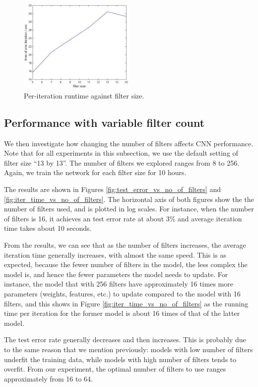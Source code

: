 \documentclass[10pt,twocolumn]{article}
\begin{document}
\begin{figure}
\includegraphics[width = 0.5\textwidth]{figure/iter_time_vs_filter_size}
\caption{Per-iteration runtime against filter size.}
\label{fig:iter_time_vs_filter_size}
\end{figure}

\subsection{Performance with variable filter count}

We then investigate how changing the number of filters affects CNN performance. Note that for all experiments in this subsection, we use the default setting of filter size ``13 by 13''. The number of filters we explored ranges from 8 to 256. Again, we train the network for each filter size for 10 hours.

The results are shown in Figures \ref{fig:test_error_vs_no_of_filters} and \ref{fig:iter_time_vs_no_of_filters}. The horizontal axis of both figures show the the number of filters used, and is plotted in log scales. For instance, when the number of filters is 16, it achieves an test error rate at about 3\% and average iteration time takes about 10 seconds.

From the results, we can see that as the number of filters increases, the average iteration time generally increases, with almost the same speed. This is as expected, because the fewer number of filters in the model, the less complex the model is, and hence the fewer parameters the model needs to update. For instance, the model that with 256 filters have approximately 16 times more parameters (weights, features, etc.) to update compared to the model with 16 filters, and this shows in Figure \ref{fig:iter_time_vs_no_of_filters} as the running time per iteration for the former model is about 16 times of that of the latter model.

The test error rate generally decreases and then increases. This is probably due to the same reason that we mention previously: models with low number of filters underfit the training data, while models with high number of filters tends to overfit. From our experiment, the optimal number of filters to use ranges approximately from 16 to 64.
\end{document}
